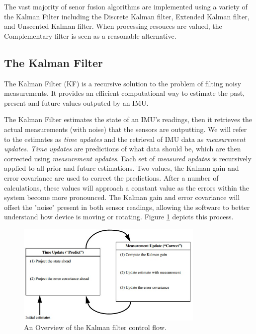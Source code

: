 \documentclass{acm_proc_article-sp}
\begin{document}
The vast majority of senor fusion algorithms are implemented using a variety of the Kalman Filter including the Discrete Kalman filter, Extended Kalman filter, and Unscented Kalman filter.\cite{brooks1998multi}   When processing resouces are valued, the Complementary filter is seen as a reasonable 
alternative.

\subsection{The Kalman Filter}

The Kalman Filter (KF) is a recursive solution to the problem of filting noisy measurements.  It provides an efficient computational 
way to estimate the past, present and future values outputed by an IMU.\cite{welch1995introduction}\cite{brooks1998multi} 

The Kalman Filter estimates the state of an IMU's readings, then it retrieves the actual measurements (with noise) that the
sensors are outputting.  We will refer to the estimates as \textit{time updates} and the retrieval of IMU data as \textit{measurement updates}.  \textit{Time updates} are predictions of what data should be, which are then corrected using \textit{measurement updates}.  Each set of \textit{measured updates} is
recursively applied to all prior and future estimations.  Two values, the Kalman gain and error covariance are used to correct the predictions.\cite{welch1995introduction}\cite{brooks1998multi}   After a
number of calculations, these values will approach a constant value as the errors within the system become more pronounced.  The Kalman gain and error covariance will offset the "noise" present in both sensor readings, allowing the software to better understand how device is moving or rotating. \cite{welch1995introduction}\cite{klein2004sensor,alves2003camera} Figure \ref{fig:kalman} depicts this process.


\begin{figure}[t]
\centering
\includegraphics[width=90mm]{kalman.jpg}
\caption{An Overview of the Kalman filter control flow.}
\label{fig:kalman}
\end{figure}
\end{document}
